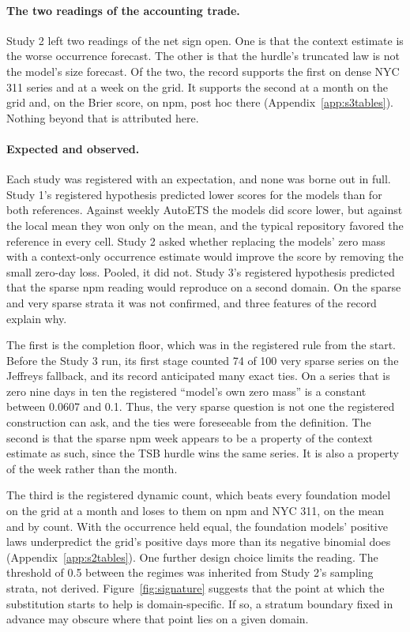 \paragraph{The two readings of the accounting trade.} Study 2 left two readings of the net sign open. One is
that the context estimate is the worse occurrence forecast. The other is that the hurdle's truncated law is
not the model's size forecast. Of the two, the record supports the first on dense NYC 311 series and at a week
on the grid. It supports the second at a month on the grid and, on the Brier score, on npm, post hoc there
(Appendix~\ref{app:s3tables}). Nothing beyond that is attributed here.

\paragraph{Expected and observed.} Each study was registered with an expectation, and none was borne out in
full. Study 1's registered hypothesis predicted lower scores for the models than for both references. Against
weekly AutoETS the models did score lower, but against the local mean they won only on the mean, and the
typical repository favored the reference in every cell. Study 2 asked whether replacing the models' zero mass
with a context-only occurrence estimate would improve the score by removing the small zero-day loss. Pooled,
it did not. Study 3's registered hypothesis predicted that the sparse npm reading would reproduce on a second
domain. On the sparse and very sparse strata it was not confirmed, and three features of the record explain
why.

The first is the completion floor, which was in the registered rule from the start. Before the Study 3 run,
its first stage counted 74 of 100 very sparse series on the Jeffreys fallback, and its record anticipated many
exact ties. On a series that is zero nine days in ten the registered ``model's own zero mass'' is a constant
between 0.0607 and 0.1. Thus, the very sparse question is not one the registered construction can ask, and the
ties were foreseeable from the definition. The second is that the sparse npm week appears to be a property of
the context estimate as such, since the TSB hurdle wins the same series. It is also a property of the week
rather than the month.

The third is the registered dynamic count, which beats every foundation model on the grid at a month and loses
to them on npm and NYC 311, on the mean and by count. With the occurrence held equal, the foundation models'
positive laws underpredict the grid's positive days more than its negative binomial does
(Appendix~\ref{app:s2tables}). One further design choice limits the reading. The threshold of 0.5 between the
regimes was inherited from Study 2's sampling strata, not derived. Figure~\ref{fig:signature} suggests that
the point at which the substitution starts to help is domain-specific. If so, a stratum boundary fixed in
advance may obscure where that point lies on a given domain.

